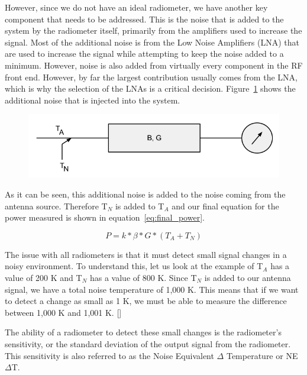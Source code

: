 However, since we do not have an ideal radiometer, we have another key component that needs to be addressed.  This is the noise that is added to the system by the radiometer itself, primarily from the amplifiers used to increase the signal.  Most of the additional noise is from the Low Noise Amplifiers (LNA) that are used to increase the signal while attempting to keep the noise added to a minimum.  However, noise is also added from virtually every component in the RF front end.  However, by far the largest contribution usually comes from the LNA, which is why the selection of the LNAs is a critical decision.  Figure~\ref{noiserad} shows the additional noise that is injected into the system.

{\begin{figure}[h!tb] 
\centering
\includegraphics[width=\textwidth]{Images/radiometer_noise_added.png}
\label{noiserad}
\end{figure}
}

As it can be seen, this additional noise is added to the noise coming from the antenna source.  Therefore T$_{N}$ is added to T$_{A}$ and our final equation for the power measured is shown in equation~\ref{eq:final_power}.  

\begin{equation} \label{eq:final_power_1}
P=k*\beta*G*(T_{A}+T_{N})
\end{equation}

The issue with all radiometers is that it must detect small signal changes in a noisy environment.  To understand this, let us look at the example of T$_{A}$ has a value of 200 K and T$_{N}$ has a value of 800 K.  Since T$_{N}$ is added to our antenna signal, we have a total noise temperature of 1,000 K.  This means that if we want to detect a change as small as 1 K, we must be able to measure the difference between 1,000 K and 1,001 K. [\cite{skou}]

The ability of a radiometer to detect these small changes is the radiometer's sensitivity, or the standard deviation of the output signal from the radiometer.  This sensitivity is also referred to as the Noise Equivalent $\Delta$ Temperature or NE$\Delta$T. 

